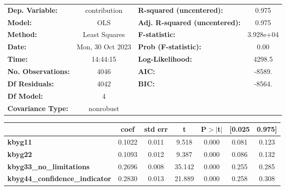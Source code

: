 \begin{center}
\begin{tabular}{lclc}
\toprule
\textbf{Dep. Variable:}                &   contribution   & \textbf{  R-squared (uncentered):}      &     0.975   \\
\textbf{Model:}                        &       OLS        & \textbf{  Adj. R-squared (uncentered):} &     0.975   \\
\textbf{Method:}                       &  Least Squares   & \textbf{  F-statistic:       }          & 3.928e+04   \\
\textbf{Date:}                         & Mon, 30 Oct 2023 & \textbf{  Prob (F-statistic):}          &     0.00    \\
\textbf{Time:}                         &     14:44:15     & \textbf{  Log-Likelihood:    }          &    4298.5   \\
\textbf{No. Observations:}             &        4046      & \textbf{  AIC:               }          &    -8589.   \\
\textbf{Df Residuals:}                 &        4042      & \textbf{  BIC:               }          &    -8564.   \\
\textbf{Df Model:}                     &           4      & \textbf{                     }          &             \\
\textbf{Covariance Type:}              &    nonrobust     & \textbf{                     }          &             \\
\bottomrule
\end{tabular}
\begin{tabular}{lcccccc}
                                       & \textbf{coef} & \textbf{std err} & \textbf{t} & \textbf{P$> |$t$|$} & \textbf{[0.025} & \textbf{0.975]}  \\
\midrule
\textbf{kbyg11}                        &       0.1022  &        0.011     &     9.518  &         0.000        &        0.081    &        0.123     \\
\textbf{kbyg22}                        &       0.1093  &        0.012     &     9.387  &         0.000        &        0.086    &        0.132     \\
\textbf{kbyg33\_no\_limitations}       &       0.2696  &        0.008     &    35.142  &         0.000        &        0.255    &        0.285     \\
\textbf{kbyg44\_confidence\_indicator} &       0.2830  &        0.013     &    21.889  &         0.000        &        0.258    &        0.308     \\

\end{tabular}
\end{center}
